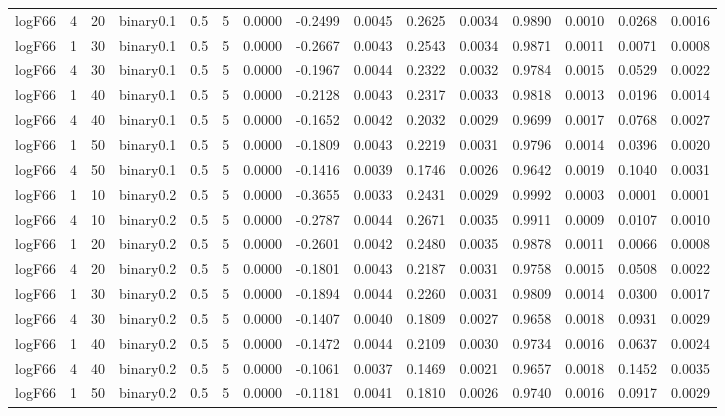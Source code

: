 \begin{longtable}{rrrrrrrrrrrrrrr}
  logF66 & 4 & 20 & binary0.1 & 0.5 & 5 & 0.0000 & -0.2499 & 0.0045 & 0.2625 & 0.0034 & 0.9890 & 0.0010 & 0.0268 & 0.0016 \\ 
  logF66 & 1 & 30 & binary0.1 & 0.5 & 5 & 0.0000 & -0.2667 & 0.0043 & 0.2543 & 0.0034 & 0.9871 & 0.0011 & 0.0071 & 0.0008 \\ 
  logF66 & 4 & 30 & binary0.1 & 0.5 & 5 & 0.0000 & -0.1967 & 0.0044 & 0.2322 & 0.0032 & 0.9784 & 0.0015 & 0.0529 & 0.0022 \\ 
  logF66 & 1 & 40 & binary0.1 & 0.5 & 5 & 0.0000 & -0.2128 & 0.0043 & 0.2317 & 0.0033 & 0.9818 & 0.0013 & 0.0196 & 0.0014 \\ 
  logF66 & 4 & 40 & binary0.1 & 0.5 & 5 & 0.0000 & -0.1652 & 0.0042 & 0.2032 & 0.0029 & 0.9699 & 0.0017 & 0.0768 & 0.0027 \\ 
  logF66 & 1 & 50 & binary0.1 & 0.5 & 5 & 0.0000 & -0.1809 & 0.0043 & 0.2219 & 0.0031 & 0.9796 & 0.0014 & 0.0396 & 0.0020 \\ 
  logF66 & 4 & 50 & binary0.1 & 0.5 & 5 & 0.0000 & -0.1416 & 0.0039 & 0.1746 & 0.0026 & 0.9642 & 0.0019 & 0.1040 & 0.0031 \\ 
  logF66 & 1 & 10 & binary0.2 & 0.5 & 5 & 0.0000 & -0.3655 & 0.0033 & 0.2431 & 0.0029 & 0.9992 & 0.0003 & 0.0001 & 0.0001 \\ 
  logF66 & 4 & 10 & binary0.2 & 0.5 & 5 & 0.0000 & -0.2787 & 0.0044 & 0.2671 & 0.0035 & 0.9911 & 0.0009 & 0.0107 & 0.0010 \\ 
  logF66 & 1 & 20 & binary0.2 & 0.5 & 5 & 0.0000 & -0.2601 & 0.0042 & 0.2480 & 0.0035 & 0.9878 & 0.0011 & 0.0066 & 0.0008 \\ 
  logF66 & 4 & 20 & binary0.2 & 0.5 & 5 & 0.0000 & -0.1801 & 0.0043 & 0.2187 & 0.0031 & 0.9758 & 0.0015 & 0.0508 & 0.0022 \\ 
  logF66 & 1 & 30 & binary0.2 & 0.5 & 5 & 0.0000 & -0.1894 & 0.0044 & 0.2260 & 0.0031 & 0.9809 & 0.0014 & 0.0300 & 0.0017 \\ 
  logF66 & 4 & 30 & binary0.2 & 0.5 & 5 & 0.0000 & -0.1407 & 0.0040 & 0.1809 & 0.0027 & 0.9658 & 0.0018 & 0.0931 & 0.0029 \\ 
  logF66 & 1 & 40 & binary0.2 & 0.5 & 5 & 0.0000 & -0.1472 & 0.0044 & 0.2109 & 0.0030 & 0.9734 & 0.0016 & 0.0637 & 0.0024 \\ 
  logF66 & 4 & 40 & binary0.2 & 0.5 & 5 & 0.0000 & -0.1061 & 0.0037 & 0.1469 & 0.0021 & 0.9657 & 0.0018 & 0.1452 & 0.0035 \\ 
  logF66 & 1 & 50 & binary0.2 & 0.5 & 5 & 0.0000 & -0.1181 & 0.0041 & 0.1810 & 0.0026 & 0.9740 & 0.0016 & 0.0917 & 0.0029 \\ 

\end{longtable}
